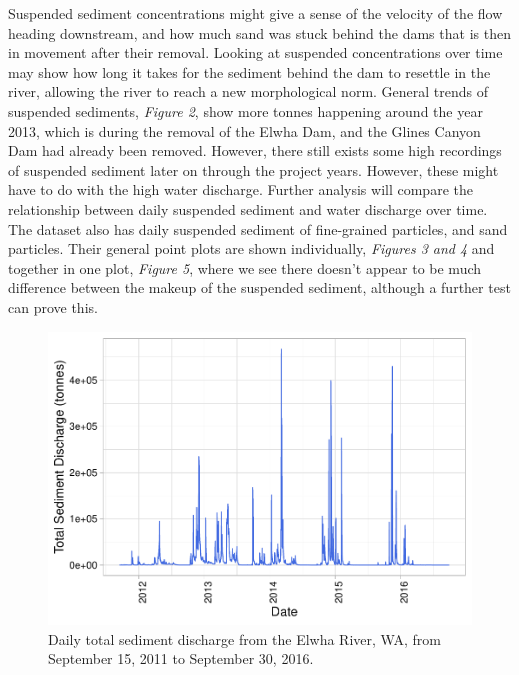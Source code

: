 \documentclass[12pt,]{article}
\begin{document}
Suspended sediment concentrations might give a sense of the velocity of
the flow heading downstream, and how much sand was stuck behind the dams
that is then in movement after their removal. Looking at suspended
concentrations over time may show how long it takes for the sediment
behind the dam to resettle in the river, allowing the river to reach a
new morphological norm. General trends of suspended sediments,
\emph{Figure 2}, show more tonnes happening around the year 2013, which
is during the removal of the Elwha Dam, and the Glines Canyon Dam had
already been removed. However, there still exists some high recordings
of suspended sediment later on through the project years. However, these
might have to do with the high water discharge. Further analysis will
compare the relationship between daily suspended sediment and water
discharge over time. The dataset also has daily suspended sediment of
fine-grained particles, and sand particles. Their general point plots
are shown individually, \emph{Figures 3 and 4} and together in one plot,
\emph{Figure 5}, where we see there doesn't appear to be much difference
between the makeup of the suspended sediment, although a further test
can prove this.

\begin{figure}
\centering
\includegraphics{Mason_ENV872_ProjectFinal_files/figure-latex/Exploratory Analysis Figure 6-1.pdf}
\caption{Daily total sediment discharge from the Elwha River, WA, from
September 15, 2011 to September 30, 2016.}
\end{figure}
\end{document}
